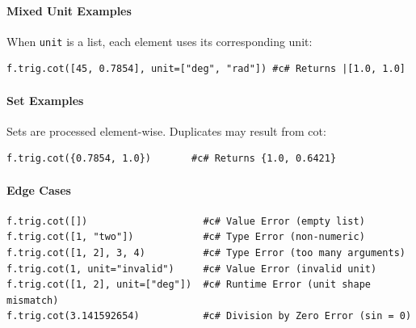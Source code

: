 \paragraph{Mixed Unit Examples}
When \texttt{unit} is a list, each element uses its corresponding unit:
\begin{verbatim}
f.trig.cot([45, 0.7854], unit=["deg", "rad"]) #c# Returns |[1.0, 1.0]
\end{verbatim}

\paragraph{Set Examples}
Sets are processed element-wise. Duplicates may result from cot:
\begin{verbatim}
f.trig.cot({0.7854, 1.0})       #c# Returns {1.0, 0.6421}
\end{verbatim}

\paragraph{Edge Cases}
\begin{verbatim}
f.trig.cot([])                    #c# Value Error (empty list)
f.trig.cot([1, "two"])            #c# Type Error (non-numeric)
f.trig.cot([1, 2], 3, 4)          #c# Type Error (too many arguments)
f.trig.cot(1, unit="invalid")     #c# Value Error (invalid unit)
f.trig.cot([1, 2], unit=["deg"])  #c# Runtime Error (unit shape mismatch)
f.trig.cot(3.141592654)           #c# Division by Zero Error (sin = 0)
\end{verbatim}

